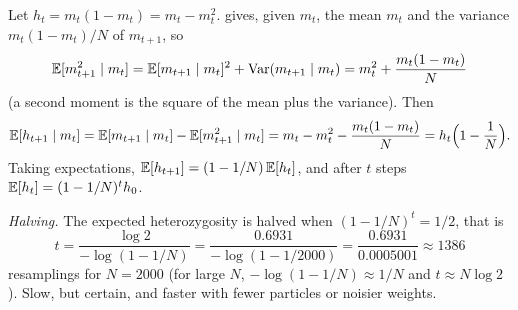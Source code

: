  Let $h_t=m_t(1-m_t)=m_t-m_t^2$. 
gives, given $m_t$, the mean $m_t$ and the variance $m_t(1-m_t)/N$ of
$m_{t+1}$, so
\[
  \mathbb{E}[m_{t+1}^2\mid m_t]=\mathbb{E}[m_{t+1}\mid m_t]^2+\operatorname{Var}(m_{t+1}\mid m_t)
  =m_t^2+\frac{m_t(1-m_t)}N
\]
(a second moment is the square of the mean plus the variance). Then
\[
  \mathbb{E}[h_{t+1}\mid m_t]=\mathbb{E}[m_{t+1}\mid m_t]-\mathbb{E}[m_{t+1}^2\mid m_t]
  =m_t-m_t^2-\frac{m_t(1-m_t)}N=h_t\Bigl(1-\frac1N\Bigr).
\]
Taking expectations, $\mathbb{E}[h_{t+1}]=(1-1/N)\,\mathbb{E}[h_t]$, and after $t$ steps
$\mathbb{E}[h_t]=(1-1/N)^th_0$.

\emph{Halving.} The expected heterozygosity is halved when
$(1-1/N)^t=1/2$, that is
\[
  t=\frac{\log2}{-\log(1-1/N)}=\frac{0.6931}{-\log(1-1/2000)}
  =\frac{0.6931}{0.0005001}\approx1386
\]
resamplings for $N=2000$ (for large $N$, $-\log(1-1/N)\approx1/N$ and
$t\approx N\log2$). Slow, but certain, and faster with fewer particles or
noisier weights.

